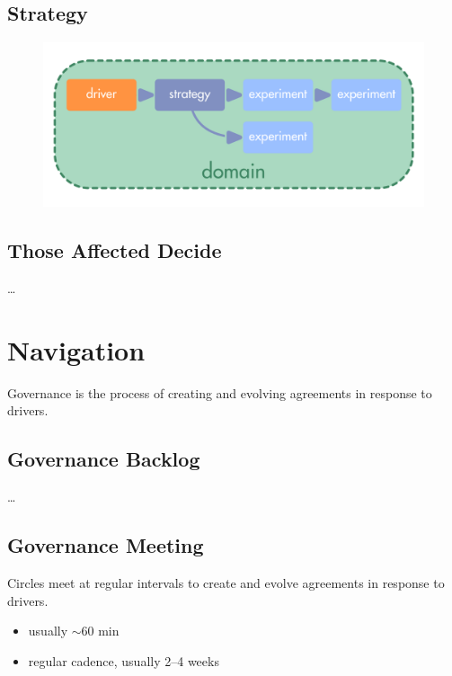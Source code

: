 \section{Strategy}
\label{strategy}

\begin{figure}[htbp]
\centering
\includegraphics[keepaspectratio,width=\textwidth,height=0.75\textheight]{img/drivers-and-subdrivers/driver-and-domains.png}
\end{figure}

\section{Those Affected Decide}
\label{thoseaffecteddecide}

{\ldots}

\chapter{Navigation}
\label{navigation}

Governance is the process of creating and evolving agreements in response to drivers.

\section{Governance Backlog}
\label{governancebacklog}

{\ldots}

\section{Governance Meeting}
\label{governancemeeting}

Circles meet at regular intervals to create and evolve agreements in response to drivers.

\begin{itemize}
\item usually \ensuremath{\sim}60 min

\item regular cadence, usually 2--4 weeks

\end{itemize}


